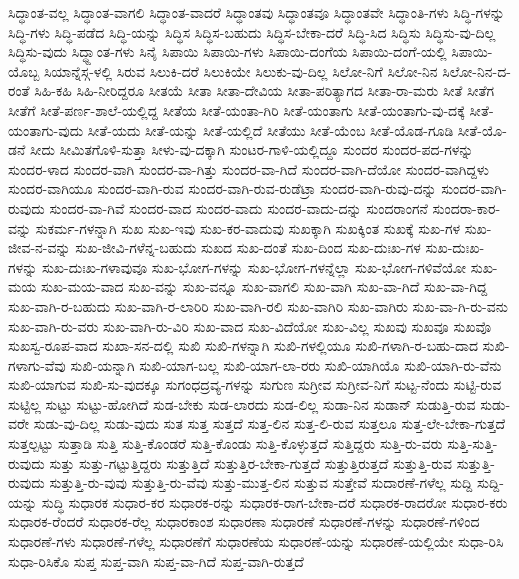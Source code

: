 {ಸಿದ್ಧಾಂತ-ವಲ್ಲ
ಸಿದ್ಧಾಂತ-ವಾಗಲಿ
ಸಿದ್ಧಾಂತ-ವಾದರೆ
ಸಿದ್ಧಾಂತವು
ಸಿದ್ಧಾಂತವೂ
ಸಿದ್ಧಾಂತವೇ
ಸಿದ್ಧಾಂತಿ-ಗಳು
ಸಿದ್ಧಿ-ಗಳನ್ನು
ಸಿದ್ಧಿ-ಗಳು
ಸಿದ್ಧಿ-ಪಡೆದ
ಸಿದ್ಧಿ-ಯನ್ನು
ಸಿದ್ಧಿಸ
ಸಿದ್ಧಿಸ-ಬಹುದು
ಸಿದ್ಧಿಸ-ಬೇಕಾ-ದರೆ
ಸಿದ್ಧಿ-ಸಿದ
ಸಿದ್ಧಿಸು
ಸಿದ್ಧಿಸು-ವು-ದಿಲ್ಲ
ಸಿದ್ಧಿಸು-ವುದು
ಸಿದ್ಧ್ದಾಂತ-ಗಳು
ಸಿನೈ
ಸಿಪಾಯಿ
ಸಿಪಾಯಿ-ಗಳು
ಸಿಪಾಯಿ-ದಂಗೆಯ
ಸಿಪಾಯಿ-ದಂಗೆ-ಯಲ್ಲಿ
ಸಿಪಾಯಿ-ಯೊಬ್ಬ
ಸಿಯಾನ್ನೆಸ್ಗ-ಳಲ್ಲಿ
ಸಿರುವ
ಸಿಲುಕಿ-ದರೆ
ಸಿಲುಕಿಯೇ
ಸಿಲುಕು-ವು-ದಿಲ್ಲ
ಸಿಲೋ-ನಿಗೆ
ಸಿಲೋ-ನಿನ
ಸಿಲೋ-ನಿನ-ದ-ರಂತೆ
ಸಿಹಿ-ಕಹಿ
ಸಿಹಿ-ನೀರಿದ್ದರೂ
ಸೀತಯೆ
ಸೀತಾ
ಸೀತಾ-ದೇವಿಯ
ಸೀತಾ-ಪರಿತ್ಯಾಗದ
ಸೀತಾ-ರಾ-ಮರು
ಸೀತೆ
ಸೀತೆಗ
ಸೀತೆಗೆ
ಸೀತೆ-ಪರ್ಣ-ಶಾಲೆ-ಯಲ್ಲಿದ್ದ
ಸೀತೆಯ
ಸೀತೆ-ಯಂತಾ-ಗಿರಿ
ಸೀತೆ-ಯಂತಾಗು
ಸೀತೆ-ಯಂತಾಗು-ವು-ದಕ್ಕೆ
ಸೀತೆ-ಯಂತಾಗು-ವುದು
ಸೀತೆ-ಯದು
ಸೀತೆ-ಯನ್ನು
ಸೀತೆ-ಯಲ್ಲಿದೆ
ಸೀತೆಯು
ಸೀತೆ-ಯೆಂಬ
ಸೀತೆ-ಯೊಡ-ಗೂಡಿ
ಸೀತೆ-ಯೊ-ಡನೆ
ಸೀದು
ಸೀಮಿತಗೊಳಿ-ಸುತ್ತಾ
ಸೀಳು-ವು-ದಕ್ಕಾಗಿ
ಸುಂಟರ-ಗಾಳಿ-ಯಲ್ಲಿದ್ದೂ
ಸುಂದರ
ಸುಂದರ-ಪದ-ಗಳನ್ನು
ಸುಂದರ-ಳಾದ
ಸುಂದರ-ವಾಗಿ
ಸುಂದರ-ವಾ-ಗಿತ್ತು
ಸುಂದರ-ವಾ-ಗಿದೆ
ಸುಂದರ-ವಾಗಿ-ದೆಯೋ
ಸುಂದರ-ವಾಗಿದ್ದಳು
ಸುಂದರ-ವಾಗಿಯೂ
ಸುಂದರ-ವಾಗಿ-ರುವ
ಸುಂದರ-ವಾಗಿ-ರುವ-ರುಡೆಟ್ರಾ
ಸುಂದರ-ವಾಗಿ-ರುವು-ದನ್ನು
ಸುಂದರ-ವಾಗಿ-ರುವುದು
ಸುಂದರ-ವಾ-ಗಿವೆ
ಸುಂದರ-ವಾದ
ಸುಂದರ-ವಾದು
ಸುಂದರ-ವಾದು-ದನ್ನು
ಸುಂದರಾಂಗನೆ
ಸುಂದರಾ-ಕಾರ-ವನ್ನು
ಸುಕರ್ಮ-ಗಳನ್ನಾಗಿ
ಸುಖ
ಸುಖ-ಇವು
ಸುಖ-ಕರ-ವಾದುವು
ಸುಖಕ್ಕಾಗಿ
ಸುಖಕ್ಕಿಂತ
ಸುಖಕ್ಕೆ
ಸುಖ-ಗಳ
ಸುಖ-ಜೀವ-ನ-ವನ್ನು
ಸುಖ-ಜೀವಿ-ಗಳೆನ್ನ-ಬಹುದು
ಸುಖದ
ಸುಖ-ದಂತೆ
ಸುಖ-ದಿಂದ
ಸುಖ-ದುಃಖ-ಗಳ
ಸುಖ-ದುಃಖ-ಗಳನ್ನು
ಸುಖ-ದುಃಖ-ಗಳಾವುವೂ
ಸುಖ-ಭೋಗ-ಗಳನ್ನು
ಸುಖ-ಭೋಗ-ಗಳನ್ನೆಲ್ಲಾ
ಸುಖ-ಭೋಗ-ಗಳಿವೆಯೋ
ಸುಖ-ಮಯ
ಸುಖ-ಮಯ-ವಾದ
ಸುಖ-ವನ್ನು
ಸುಖ-ವನ್ನೂ
ಸುಖ-ವಾಗಲಿ
ಸುಖ-ವಾಗಿ
ಸುಖ-ವಾ-ಗಿದೆ
ಸುಖ-ವಾ-ಗಿದ್ದ
ಸುಖ-ವಾಗಿ-ರ-ಬಹುದು
ಸುಖ-ವಾಗಿ-ರ-ಲಾರಿರಿ
ಸುಖ-ವಾಗಿ-ರಲಿ
ಸುಖ-ವಾಗಿರಿ
ಸುಖ-ವಾಗಿರು
ಸುಖ-ವಾ-ಗಿ-ರು-ವನು
ಸುಖ-ವಾಗಿ-ರು-ವರು
ಸುಖ-ವಾಗಿ-ರು-ವಿರಿ
ಸುಖ-ವಾದ
ಸುಖ-ವಿದೆಯೋ
ಸುಖ-ವಿಲ್ಲ
ಸುಖವು
ಸುಖವೂ
ಸುಖವೊ
ಸುಖಸ್ವ-ರೂಪ-ವಾದ
ಸುಖಾ-ಸನ-ದಲ್ಲಿ
ಸುಖಿ
ಸುಖಿ-ಗಳನ್ನಾಗಿ
ಸುಖಿ-ಗಳಲ್ಲಿಯೂ
ಸುಖಿ-ಗಳಾಗಿ-ರ-ಬಹು-ದಾದ
ಸುಖಿ-ಗಳಾಗು-ವೆವು
ಸುಖಿ-ಯನ್ನಾಗಿ
ಸುಖಿ-ಯಾಗ-ಬಲ್ಲ
ಸುಖಿ-ಯಾಗ-ಲಾ-ರರು
ಸುಖಿ-ಯಾಗಿಯೊ
ಸುಖಿ-ಯಾಗಿ-ರು-ವೆನು
ಸುಖಿ-ಯಾಗುವ
ಸುಖಿ-ಸು-ವುದಕ್ಕೂ
ಸುಗಂಧದ್ರವ್ಯ-ಗಳನ್ನು
ಸುಗುಣ
ಸುಗ್ರೀವ
ಸುಗ್ರೀವ-ನಿಗೆ
ಸುಟ್ಟ-ನೆಂದು
ಸುಟ್ಟಿ-ರುವ
ಸುಟ್ಟಿಲ್ಲ
ಸುಟ್ಟು
ಸುಟ್ಟು-ಹೋಗಿದೆ
ಸುಡ-ಬೇಕು
ಸುಡ-ಲಾರದು
ಸುಡ-ಲಿಲ್ಲ
ಸುಡಾ-ನಿನ
ಸುಡಾನ್
ಸುಡುತ್ತಿ-ರುವ
ಸುಡು-ವರೇ
ಸುಡು-ವು-ದಿಲ್ಲ
ಸುಡು-ವುದು
ಸುತ
ಸುತ್ತ
ಸುತ್ತದೆ
ಸುತ್ತ-ಲಿನ
ಸುತ್ತ-ಲಿ-ರುವ
ಸುತ್ತಲೂ
ಸುತ್ತ-ಲೇ-ಬೇಕಾ-ಗುತ್ತದೆ
ಸುತ್ತಲ್ಪಟ್ಟು
ಸುತ್ತಾಡಿ
ಸುತ್ತಿ
ಸುತ್ತಿ-ಕೊಂಡರೆ
ಸುತ್ತಿ-ಕೊಂಡು
ಸುತ್ತಿ-ಕೊಳ್ಳುತ್ತದೆ
ಸುತ್ತಿದ್ದರು
ಸುತ್ತಿ-ರು-ವರು
ಸುತ್ತಿ-ಸುತ್ತಿ-ರುವುದು
ಸುತ್ತು
ಸುತ್ತು-ಗಟ್ಟುತ್ತಿದ್ದರು
ಸುತ್ತುತ್ತಿದೆ
ಸುತ್ತುತ್ತಿರ-ಬೇಕಾ-ಗುತ್ತದೆ
ಸುತ್ತುತ್ತಿರುತ್ತದೆ
ಸುತ್ತುತ್ತಿ-ರುವ
ಸುತ್ತುತ್ತಿ-ರುವುದು
ಸುತ್ತುತ್ತಿ-ರು-ವುವು
ಸುತ್ತುತ್ತಿ-ರು-ವೆವು
ಸುತ್ತು-ಮುತ್ತ-ಲಿನ
ಸುತ್ತುವ
ಸುತ್ತೇವೆ
ಸುದಾರಣೆ-ಗಳೆಲ್ಲ
ಸುದ್ದಿ
ಸುದ್ದಿ-ಯನ್ನು
ಸುದ್ಧಿ
ಸುಧಾರಕ
ಸುಧಾರ-ಕರ
ಸುಧಾರಕ-ರನ್ನು
ಸುಧಾರಕ-ರಾಗ-ಬೇಕಾ-ದರೆ
ಸುಧಾರಕ-ರಾದರೋ
ಸುಧಾರ-ಕರು
ಸುಧಾರಕ-ರೆಂದರೆ
ಸುಧಾರಕ-ರೆಲ್ಲ
ಸುಧಾರಕಾಂಶ
ಸುಧಾರಣಾ
ಸುಧಾರಣೆ
ಸುಧಾರಣೆ-ಗಳನ್ನು
ಸುಧಾರಣೆ-ಗಳಿಂದ
ಸುಧಾರಣೆ-ಗಳು
ಸುಧಾರಣೆ-ಗಳೆಲ್ಲ
ಸುಧಾರಣೆಗೆ
ಸುಧಾರಣೆಯ
ಸುಧಾರಣೆ-ಯನ್ನು
ಸುಧಾರಣೆ-ಯಲ್ಲಿಯೇ
ಸುಧಾ-ರಿಸಿ
ಸುಧಾ-ರಿಸಿಕೊ
ಸುಪ್ತ
ಸುಪ್ತ-ವಾಗಿ
ಸುಪ್ತ-ವಾ-ಗಿದೆ
ಸುಪ್ತ-ವಾಗಿ-ರುತ್ತದೆ
}
